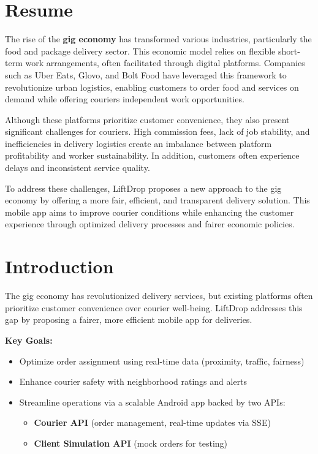 \documentclass[a4paper,twoside,11pt]{article}
\begin{document}
\section {Resume} 

The rise of the \textbf{gig economy} has transformed various industries, particularly the food and package delivery sector. This economic model relies on flexible short-term work arrangements, often facilitated through digital platforms. Companies such as Uber Eats, Glovo, and Bolt Food have leveraged this framework to revolutionize urban logistics, enabling customers to order food and services on demand while offering couriers independent work opportunities.

\vspace{5mm}

Although these platforms prioritize customer convenience, they also present significant challenges for couriers. High commission fees, lack of job stability, and inefficiencies in delivery logistics create an imbalance between platform profitability and worker sustainability. In addition, customers often experience delays and inconsistent service quality.

\vspace{5mm}

To address these challenges, LiftDrop proposes a new approach to the gig economy by offering a more fair, efficient, and transparent delivery solution. This mobile app aims to improve courier conditions while enhancing the customer experience through optimized delivery processes and fairer economic policies.

\newpage

\section{Introduction}
The gig economy has revolutionized delivery services, but existing platforms often prioritize customer convenience over courier well-being. LiftDrop addresses this gap by proposing a fairer, more efficient mobile app for deliveries.

\vspace{3mm}

\textbf{Key Goals:}

\begin{itemize}
    \item Optimize order assignment using real-time data (proximity, traffic, fairness)
    \item Enhance courier safety with neighborhood ratings and alerts
    \item Streamline operations via a scalable Android app backed by two APIs:
    \begin{itemize}
        \item \textbf{Courier API} (order management, real-time updates via SSE)
        \item \textbf{Client Simulation API} (mock orders for testing)
    \end{itemize}
\end{itemize}
\end{document}
